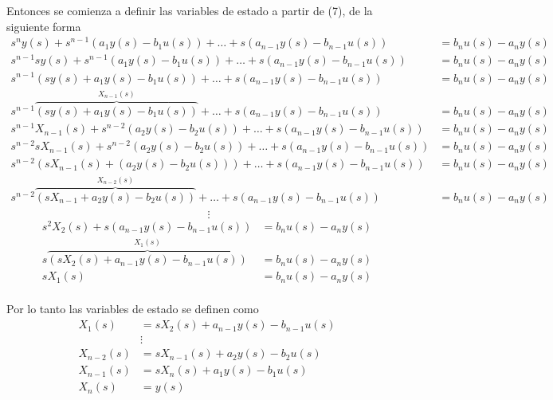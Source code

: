 Entonces se comienza a definir las variables de estado a partir de (7), de la siguiente forma
\[
    \begin{split}
        s^{n}y(s) + s^{n-1}( a_{1}y(s)-b_{1}u(s) ) 
        + \ldots + s( a_{n-1}y(s)-b_{n-1}u(s) ) & = b_{n}u(s)-a_{n}y(s) \\
        s^{n-1}sy(s) + s^{n-1}(a_{1}y(s)-b_{1}u(s)) 
        + \ldots + s( a_{n-1}y(s)-b_{n-1}u(s) ) & = b_{n}u(s)-a_{n}y(s) \\
        s^{n-1}( sy(s)+a_{1}y(s)-b_{1}u(s) )+ \ldots + s( a_{n-1}y(s)-b_{n-1}u(s) ) & = b_{n}u(s)-a_{n}y(s) \\
        s^{n-1}
        \overbrace{ (sy(s)+a_{1}y(s)-b_{1}u(s)) }^{ X_{n-1}(s) } + \ldots + s(a_{n-1}y(s) - b_{n-1}u(s)) & = b_{n}u(s)-a_{n}y(s)\\
        s^{n-1}X_{n-1}(s) + s^{n-2}( a_{2}y(s)-b_{2}u(s) ) + \ldots + s( a_{n-1}y(s)-b_{n-1}u(s) ) & = b_{n}u(s) - a_{n}y(s) \\
        s^{n-2}sX_{n-1}(s)+s^{n-2}( a_{2}y(s)-b_{2}u(s) ) + \ldots + s( a_{n-1}y(s)-b_{n-1}u(s) ) & = b_{n}u(s) - a_{n}y(s) \\
        s^{n-2}( sX_{n-1}(s)+(a_{2}y(s)-b_{2}u(s)) ) + \ldots + s( a_{n-1}y(s)-b_{n-1}u(s) ) & = b_{n}u(s) - a_{n}y(s) \\
        s^{n-2}
        \overbrace{ (sX_{n-1}+a_{2}y(s)-b_{2}u(s)) }^{ X_{n-2}(s) } + \ldots + s( a_{n-1}y(s)-b_{n-1}u(s)) & = b_{n}u(s) - a_{n}y(s) \\
    \end{split}
\]
\[
    \;\vdots
\]
\[
    \begin{split}
        s^{2}X_{2}(s)+s(a_{n-1}y(s)-b_{n-1}u(s)) & = b_{n}u(s)-a_{n}y(s) \\
        s
        \overbrace{ (sX_{2}(s)+a_{n-1}y(s)-b_{n-1}u(s)) }^{ X_{1}(s) } & = b_{n}u(s) - a_{n}y(s) \\
        sX_{1}(s) & = b_{n}u(s) - a_{n}y(s) \\
    \end{split}
\]

Por lo tanto las variables de estado se definen como
\[
    \begin{split}
        X_{1}(s) & = sX_{2}(s)+a_{n-1}y(s)-b_{n-1}u(s) \\
        &\vdots \\
        X_{n-2}(s) & = sX_{n-1}(s)+a_{2}y(s)-b_{2}u(s) \\
        X_{n-1}(s) & = sX_{n}(s)+a_{1}y(s)-b_{1}u(s) \\
        X_{n}(s) & = y(s)
    \end{split}
\]

